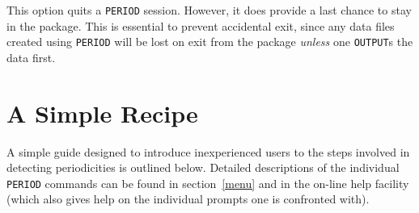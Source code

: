 \documentclass[twoside,11pt,noabs,nolof]{starlink}
\begin{document}
This option quits a \texttt{PERIOD} session. However, it does provide a last
chance to stay in the package. This is essential to prevent accidental exit,
since any data files created using \texttt{PERIOD} will be lost on exit from the
package \emph{unless} one \texttt{OUTPUT}s the data first.

\section{A Simple Recipe}
\label{recipe}

A simple guide designed to introduce inexperienced users to the steps involved
in detecting periodicities is outlined below. Detailed descriptions of the
individual \texttt{PERIOD} commands can be found in section~\ref{menu} and in
the on-line help facility (which also gives help on the individual prompts
one is confronted with).
\end{document}
